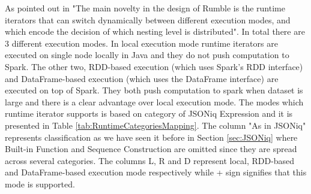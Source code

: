 As pointed out in \cite{RumblePaper} "The main novelty in the design of Rumble is the runtime iterators that can switch dynamically between different execution modes, and which encode the decision of which nesting level is distributed". In total there are 3 different execution modes. In local execution mode runtime iterators are executed on single node locally in Java and they do not push computation to Spark. The other two, RDD-based execution (which uses Spark’s RDD interface) and  DataFrame-based execution (which uses the DataFrame interface) are executed on top of Spark. They both push computation to spark when dataset is large and there is a clear advantage over local execution mode. The modes which runtime iterator supports is based on category of JSONiq Expression and it is presented in Table \ref{tab:RuntimeCategoriesMapping}. The column "As in JSONiq" represents classification as we have seen it before in Section \ref{sec:JSONiq} where Built-in Function and Sequence Construction are omitted since they are spread across several categories. The columns L, R and D represent local, RDD-based and DataFrame-based execution mode respectively while + sign signifies that this mode is supported.

